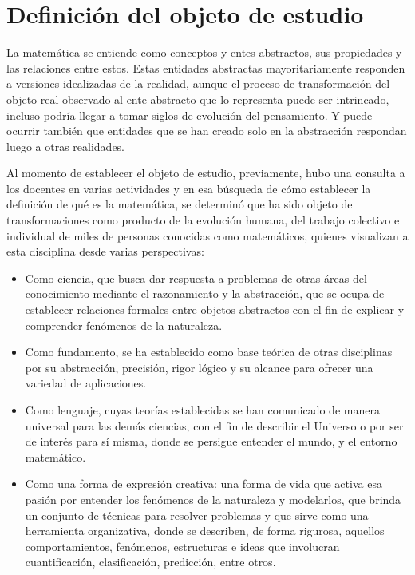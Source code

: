 
\section{Definición del objeto de estudio}

La matemática se entiende como conceptos y entes abstractos, sus propiedades y las relaciones entre estos. Estas entidades abstractas mayoritariamente responden a versiones idealizadas de la realidad, aunque el proceso de transformación del objeto real observado al ente abstracto que lo representa puede ser intrincado, incluso podría llegar a tomar siglos de evolución del pensamiento. Y puede ocurrir también que entidades que se han creado solo en la abstracción respondan luego a otras realidades. 

Al momento de establecer el objeto de estudio, previamente, hubo una consulta a los docentes en varias actividades y en esa búsqueda de cómo establecer la definición de qué es la matemática, se determinó que ha sido objeto de transformaciones como producto de la evolución humana, del trabajo colectivo e individual de miles de personas conocidas como matemáticos, quienes visualizan a esta disciplina desde varias perspectivas: 

\begin{itemize}
    
     \color{blue} \item \color{black} Como ciencia, que busca dar respuesta a problemas de otras áreas del conocimiento mediante el razonamiento y la abstracción, que se ocupa de establecer relaciones formales entre objetos abstractos con el fin de explicar y comprender fenómenos de la naturaleza.
    
    \color{blue} \item \color{black} Como fundamento, se ha establecido como base teórica de otras disciplinas por su abstracción, precisión, rigor lógico y su alcance para ofrecer una variedad de aplicaciones.
    
    \color{blue} \item \color{black} Como lenguaje, cuyas teorías establecidas se han comunicado de manera universal para las demás ciencias, con el fin de describir el Universo o por ser de interés para sí misma, donde se persigue entender el mundo, y el entorno matemático. 
    
    \color{blue} \item \color{black} Como una forma de expresión creativa: una forma de vida que activa esa pasión por entender los fenómenos de la naturaleza y modelarlos, que brinda un conjunto de técnicas para resolver problemas y que sirve como una herramienta organizativa, donde se describen, de forma rigurosa, aquellos comportamientos, fenómenos, estructuras e ideas que involucran cuantificación, clasificación, predicción, entre otros. 
    \end{itemize}

